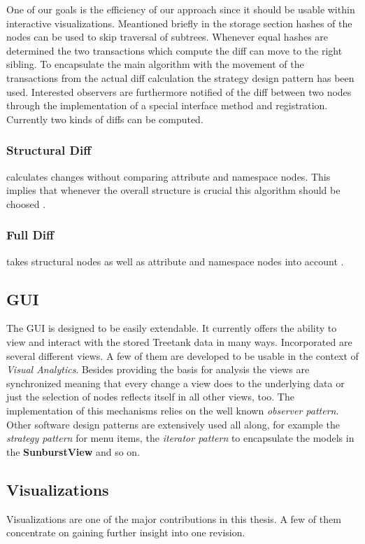 One of our goals is the efficiency of our approach since it should be usable within interactive visualizations. Meantioned briefly in the storage section hashes of the nodes can be used to skip traversal of subtrees. Whenever equal hashes are determined the two transactions which compute the diff can move to the right sibling. To encapsulate the main algorithm with the movement of the transactions from the actual diff calculation the strategy design pattern has been used. Interested observers are furthermore notified of the diff between two nodes through the implementation of a special interface method and registration. Currently two kinds of diffs can be computed.

\subsubsection{Structural Diff} calculates changes without comparing attribute and namespace nodes. This implies that whenever the overall structure is crucial this algorithm should be choosed .
\subsubsection{Full Diff} takes structural nodes as well as attribute and namespace nodes into account .
\subsection{GUI}
The GUI is designed to be easily extendable. It currently offers the ability to view and interact with the stored Treetank data in many ways. Incorporated are several different views. A few of them are developed to be usable in the context of \emph{Visual Analytics}. Besides providing the basis for analysis the views are synchronized meaning that every change a view does to the underlying data or just the selection of nodes reflects itself in all other views, too. The implementation of this mechanisms relies on the well known \emph{observer pattern}. Other software design patterns are extensively used all along, for example the \emph{strategy pattern} for menu items, the \emph{iterator pattern} to encapsulate the models in the \textbf{SunburstView} and so on.
\subsection{Visualizations}
Visualizations are one of the major contributions in this thesis. A few of them concentrate on gaining further insight into one revision. 

